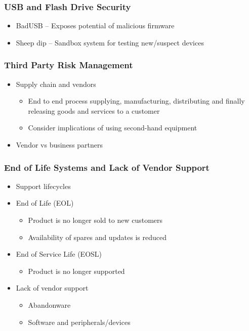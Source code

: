 		\subsubsection {USB and Flash Drive Security}
			\begin{itemize}
				\item BadUSB -- Exposes potential of malicious firmware
				\item Sheep dip -- Sandbox system for testing new/suspect devices
			\end{itemize}
		\subsubsection {Third Party Risk Management}
			\begin{itemize}
				\item Supply chain and vendors
					\begin{itemize}
						\item End to end process supplying, manufacturing, distributing
							and finally releasing goods and services to a customer
						\item Consider implications of using second-hand equipment
					\end{itemize}
				\item Vendor vs business partners
			\end{itemize}
		\subsubsection {End of Life Systems and Lack of Vendor Support}
			\begin{itemize}
				\item Support lifecycles
				\item End of Life (EOL)
					\begin{itemize}
						\item Product is no longer sold to new customers
						\item Availability of spares and updates is reduced
					\end{itemize}
				\item End of Service Life (EOSL)
					\begin{itemize}
						\item Product is no longer supported
					\end{itemize}
				\item Lack of vendor support
					\begin{itemize}
						\item Abandonware
						\item Software and peripherals/devices
					\end{itemize}
			\end{itemize}

